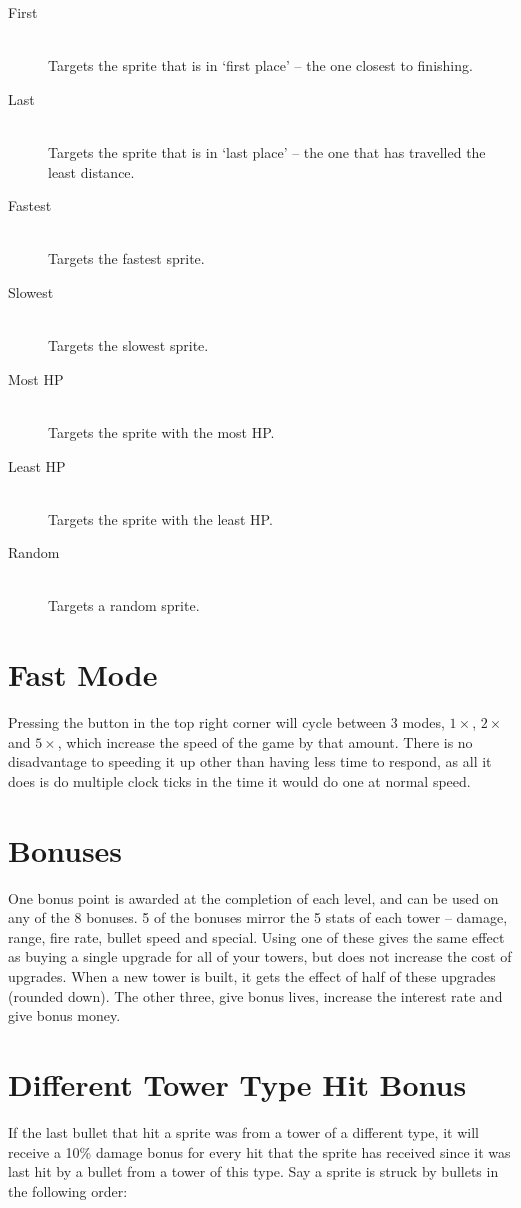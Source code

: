 \documentclass[a4paper,11pt]{article}
\begin{document}
\begin{description}
 \item[First]\quad\\ Targets the sprite that is in `first place' -- the one closest to finishing.
 \item[Last]\quad\\ Targets the sprite that is in `last place' -- the one that has travelled the least distance.
 \item[Fastest]\quad\\ Targets the fastest sprite.
 \item[Slowest]\quad\\ Targets the slowest sprite.
 \item[Most HP]\quad\\ Targets the sprite with the most HP.
 \item[Least HP]\quad\\ Targets the sprite with the least HP.
 \item[Random]\quad\\ Targets a random sprite.
\end{description}


\section{Fast Mode}
Pressing the button in the top right corner will cycle between 3 modes, \(1 \times\), \(2 \times\) and \(5 \times\), which increase the speed of the game by that amount. There is no disadvantage to speeding it up other than having less time to respond, as all it does is do multiple clock ticks in the time it would do one at normal speed.

\section{Bonuses}
One bonus point is awarded at the completion of each level, and can be used on any of the 8 bonuses. 5 of the bonuses mirror the 5 stats of each tower -- damage, range, fire rate, bullet speed and special. Using one of these gives the same effect as buying a single upgrade for all of your towers, but does not increase the cost of upgrades. When a new tower is built, it gets the effect of half of these upgrades (rounded down). The other three, give bonus lives, increase the interest rate and give bonus money.

\section{Different Tower Type Hit Bonus}
If the last bullet that hit a sprite was from a tower of a different type, it will receive a 10\% damage bonus for every hit that the sprite has received since it was last hit by a bullet from a tower of this type. Say a sprite is struck by bullets in the following order:
\end{document}
